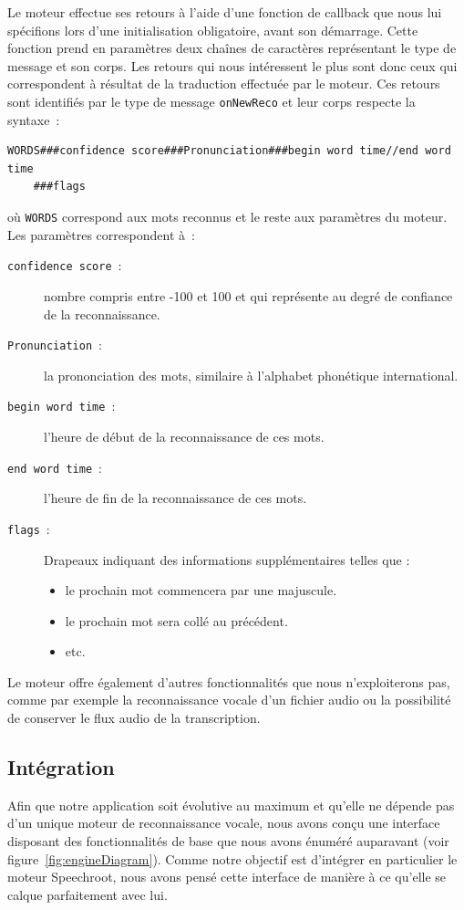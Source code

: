 Le moteur effectue ses retours à l'aide d'une fonction de callback que nous lui spécifions lors d'une initialisation obligatoire, avant son démarrage.
Cette fonction prend en paramètres deux chaînes de caractères représentant le type de message et son corps.
Les retours qui nous intéressent le plus sont donc ceux qui correspondent à résultat de la traduction effectuée par le moteur.
Ces retours sont identifiés par le type de message \texttt{onNewReco} et leur corps respecte la syntaxe~:
\begin{verbatim}
WORDS###confidence score###Pronunciation###begin word time//end word time
    ###flags
\end{verbatim}
où \texttt{WORDS} correspond aux mots reconnus et le reste aux paramètres du moteur.
Les paramètres correspondent à~:
\begin{description}
\item [\texttt{confidence score}~:] nombre compris entre -100 et 100 et qui représente au degré de confiance de la reconnaissance.
\item [\texttt{Pronunciation}~:] la prononciation des mots, similaire à l'alphabet phonétique international.
\item [\texttt{begin word time}~:] l'heure de début de la reconnaissance de ces mots.
\item [\texttt{end word time}~:] l'heure de fin de la reconnaissance de ces mots.
\item [\texttt{flags}~:] Drapeaux indiquant des informations supplémentaires telles que :
\begin{itemize}
\item le prochain mot commencera par une majuscule.
\item le prochain mot sera collé au précédent.
\item etc.
\end{itemize}
\end{description}

Le moteur offre également d'autres fonctionnalités que nous n'exploiterons pas, comme par exemple la reconnaissance vocale d'un fichier audio ou la possibilité de conserver le flux audio de la transcription.

\subsection{Intégration}
Afin que notre application soit évolutive au maximum et qu'elle ne dépende pas d'un unique moteur de reconnaissance vocale, nous avons conçu une interface disposant des fonctionnalités de base que nous avons énuméré auparavant (voir figure~\ref{fig:engineDiagram}).
Comme notre objectif est d'intégrer en particulier le moteur Speechroot, nous avons pensé cette interface de manière à ce qu'elle se calque parfaitement avec lui.


